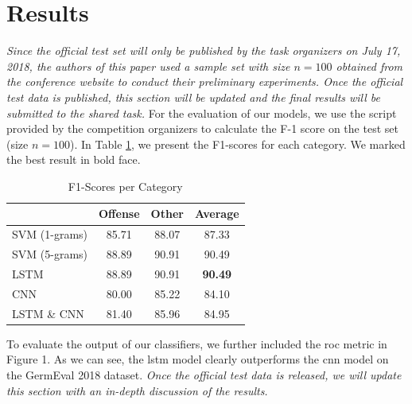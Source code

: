 \documentclass[11pt]{article}
\begin{document}
\section{Results}
\textit{Since the official test set will only be published by the task organizers on July 17, 2018, the authors of this paper used a sample set with size $n=100$ obtained from the conference website to conduct their preliminary experiments. Once the official test data is published, this section will be updated and the final results will be submitted to the shared task.} 
\newline
\newline
For the evaluation of our models, we use the script provided by the competition organizers to calculate the F-1 score on the test set (size $n=100$). In Table \ref{tbl:results}, we present the F1-scores for each category. We marked the best result in bold face. 
\newline 
\begin{table}[h]
\begin{center}
\begin{tabular}{l  c c c }
\toprule   &  Offense &  Other &   Average  \\ \midrule
SVM (1-grams) & 85.71 & 88.07 & 87.33  \\
SVM (5-grams) & 88.89 & 90.91 & 90.49  \\
LSTM & 88.89 & 90.91 & \textbf{90.49}  \\
CNN & 80.00 & 85.22 & 84.10  \\
LSTM \& CNN & 81.40 & 85.96 & 84.95  \\
\bottomrule
\end{tabular}
\end{center}
\caption{\label{tbl:results} F1-Scores per Category}
\end{table}
\newline
To evaluate the output of our classifiers, we further included the \ac{roc} metric in Figure 1. As we can see, the \ac{lstm} model clearly outperforms the \ac{cnn} model on the GermEval 2018 dataset. 
\newline
\textit{Once the official test data is released, we will update this section with an in-depth discussion of the results.}
\end{document}
